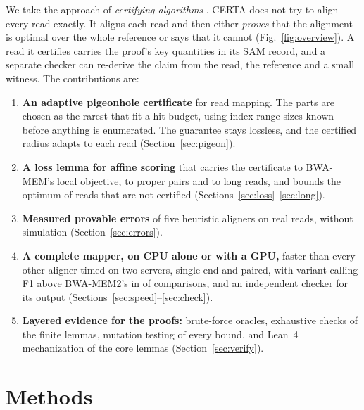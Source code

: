 \documentclass[11pt]{article}
\theoremstyle{definition}
\begin{document}
We take the approach of \emph{certifying algorithms}
\citep{mcconnell2011certifying}. CERTA does not try to align every read
exactly. It aligns each read and then either \emph{proves} that the
alignment is optimal over the whole reference or says that it cannot
(Fig.~\ref{fig:overview}). A
read it certifies carries the proof's key quantities in its SAM record, and
a separate checker can re-derive the claim from the read, the reference and
a small witness. The contributions are:
\begin{enumerate}
\item \textbf{An adaptive pigeonhole certificate} for read mapping. The
  parts are chosen as the rarest that fit a hit budget, using index range
  sizes known before anything is enumerated. The guarantee stays lossless,
  and the certified radius adapts to each read (Section~\ref{sec:pigeon}).
\item \textbf{A loss lemma for affine scoring} that carries the
  certificate to BWA-MEM's local objective, to proper pairs and to long
  reads, and bounds the optimum of reads that are not certified
  (Sections~\ref{sec:loss}--\ref{sec:long}).
\item \textbf{Measured provable errors} of five heuristic aligners on real
  reads, without simulation (Section~\ref{sec:errors}).
\item \textbf{A complete mapper, on CPU alone or with a GPU,} faster than
  every other aligner timed on two servers, single-end and paired, with
  variant-calling F1 above BWA-MEM2's in \PeVWins{} of \PeVComparisons{}
  comparisons, and an independent checker for its output
  (Sections~\ref{sec:speed}--\ref{sec:check}).
\item \textbf{Layered evidence for the proofs:} brute-force oracles,
  exhaustive checks of the finite lemmas, mutation testing of every bound,
  and Lean~4 mechanization of the core lemmas (Section~\ref{sec:verify}).
\end{enumerate}

\section{Methods}
\end{document}
